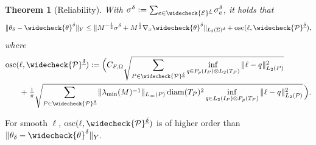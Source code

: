 \documentclass{amsart}
\newcommand{\osc}{{\rm osc}}
\newtheorem{theorem}{Theorem}[section]
\numberwithin{equation}{section}
\newcommand{\cE}{\mathcal E}
\DeclareMathOperator{\diam}{diam}
\newcommand{\1}{\mathbb 1}
\newcommand{\pria}{{\mathcal P}}
\begin{document}
 \begin{theorem}[Reliability] \label{thm:reliability}
With $\sigma^\delta:=\sum_{e \in \widecheck{\cE}^{\underline{\delta}}} \sigma_e^\delta$, it holds that 
$$
\|\theta_\delta -  \widecheck{\theta}^\delta \|_Y
\leq
\|M^{-\frac12} \sigma^\delta+M^{\frac12} \nabla_x  \widecheck{\theta}^\delta\|_{L_2(\Sigma)^d}+\osc(\ell,\widecheck{\pria}^{\underline{\delta}}),
$$
where
\begin{align*}
\osc(&\ell,\widecheck{\pria}^{\underline{\delta}}):=
\Big(C_{F,\Omega}\sqrt{\sum_{P \in \widecheck{\pria}^{\underline{\delta}}}  \inf_{q \in P_p(I_P) \otimes L_2(T_P)} \|\ell-q\|_{L_2(P)}^2}\\
&+\tfrac{1}{\pi} \sqrt{\sum_{P \in \widecheck{\pria}^{\underline{\delta}}} 
{\|\lambda_{\min}(M)^{-1}\|_{L_\infty(P)}}
\diam(T_P)^2  \inf_{q \in L_2(I_P) \otimes P_p(T_P)} \|\ell-q\|^2_{L_2(P)}} \,\Big).
\end{align*}
 \end{theorem}
 
 \begin{remark} For smooth $\ell$, $\osc(\ell,\widecheck{\pria}^{\underline{\delta}})$ is of higher order than $\|\theta_\delta -  \widecheck{\theta}^\delta \|_Y$.
 \end{remark}
 
\end{document}
